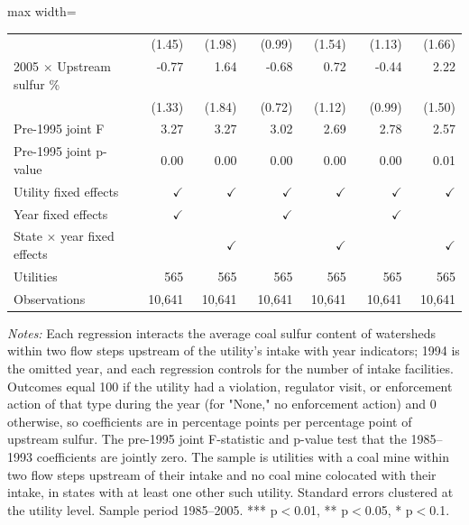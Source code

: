 \begin{table}[htbp]
{\begin{adjustbox}{max width=\linewidth}
\begin{tabular}{lrrrrrr}
 & (\phantom{-}1.45)\phantom{$^{***}$} & (\phantom{-}1.98)\phantom{$^{***}$} & (\phantom{-}0.99)\phantom{$^{***}$} & (\phantom{-}1.54)\phantom{$^{***}$} & (\phantom{-}1.13)\phantom{$^{***}$} & (\phantom{-}1.66)\phantom{$^{***}$} \\
2005 $\times$ Upstream sulfur \% & \phantom{(}-0.77$^{\phantom{*}\phantom{*}\phantom{*}}$ & \phantom{(}\phantom{-}1.64$^{\phantom{*}\phantom{*}\phantom{*}}$ & \phantom{(}-0.68$^{\phantom{*}\phantom{*}\phantom{*}}$ & \phantom{(}\phantom{-}0.72$^{\phantom{*}\phantom{*}\phantom{*}}$ & \phantom{(}-0.44$^{\phantom{*}\phantom{*}\phantom{*}}$ & \phantom{(}\phantom{-}2.22$^{\phantom{*}\phantom{*}\phantom{*}}$ \\
 & (\phantom{-}1.33)\phantom{$^{***}$} & (\phantom{-}1.84)\phantom{$^{***}$} & (\phantom{-}0.72)\phantom{$^{***}$} & (\phantom{-}1.12)\phantom{$^{***}$} & (\phantom{-}0.99)\phantom{$^{***}$} & (\phantom{-}1.50)\phantom{$^{***}$} \\
\hline
Pre-1995 joint F & 3.27 & 3.27 & 3.02 & 2.69 & 2.78 & 2.57 \\
Pre-1995 joint p-value & 0.00 & 0.00 & 0.00 & 0.00 & 0.00 & 0.01 \\
Utility fixed effects & $\checkmark$ & $\checkmark$ & $\checkmark$ & $\checkmark$ & $\checkmark$ & $\checkmark$ \\
Year fixed effects & $\checkmark$ &  & $\checkmark$ &  & $\checkmark$ &  \\
State $\times$ year fixed effects &  & $\checkmark$ &  & $\checkmark$ &  & $\checkmark$ \\
Utilities & 565 & 565 & 565 & 565 & 565 & 565 \\
Observations & 10,641 & 10,641 & 10,641 & 10,641 & 10,641 & 10,641 \\
\bottomrule
\end{tabular}
\end{adjustbox}
}
\begin{minipage}{\linewidth}
\vspace{4pt}
\footnotesize
\raggedright
\textit{Notes:} Each regression interacts the average coal sulfur content of watersheds within two flow steps upstream of the utility's intake with year indicators; 1994 is the omitted year, and each regression controls for the number of intake facilities. Outcomes equal 100 if the utility had a violation, regulator visit, or enforcement action of that type during the year (for "None," no enforcement action) and 0 otherwise, so coefficients are in percentage points per percentage point of upstream sulfur. The pre-1995 joint F-statistic and p-value test that the 1985--1993 coefficients are jointly zero. The sample is utilities with a coal mine within two flow steps upstream of their intake and no coal mine colocated with their intake, in states with at least one other such utility. Standard errors clustered at the utility level. Sample period 1985--2005. *** p$<$0.01, ** p$<$0.05, * p$<$0.1.
\end{minipage}
\end{table}
